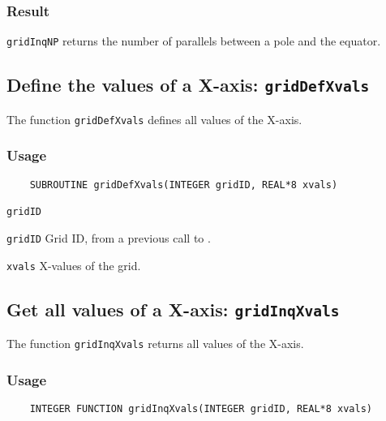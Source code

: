 \subsubsection*{Result}

{\texttt{gridInqNP}} returns the number of parallels between a pole and the equator.



\subsection{Define the values of a X-axis: \texttt{gridDefXvals}}
\label{gridDefXvals}

The function {\texttt{gridDefXvals}} defines all values of the X-axis.

\subsubsection*{Usage}

\begin{verbatim}
    SUBROUTINE gridDefXvals(INTEGER gridID, REAL*8 xvals)
\end{verbatim}

\hspace*{4mm}\begin{minipage}[]{15cm}
\begin{deflist}{\texttt{gridID}\ }
\item[\texttt{gridID}]
Grid ID, from a previous call to {}.
\item[\texttt{xvals}]
X-values of the grid.

\end{deflist}
\end{minipage}


\subsection{Get all values of a X-axis: \texttt{gridInqXvals}}
\label{gridInqXvals}

The function {\texttt{gridInqXvals}} returns all values of the X-axis.

\subsubsection*{Usage}

\begin{verbatim}
    INTEGER FUNCTION gridInqXvals(INTEGER gridID, REAL*8 xvals)
\end{verbatim}

